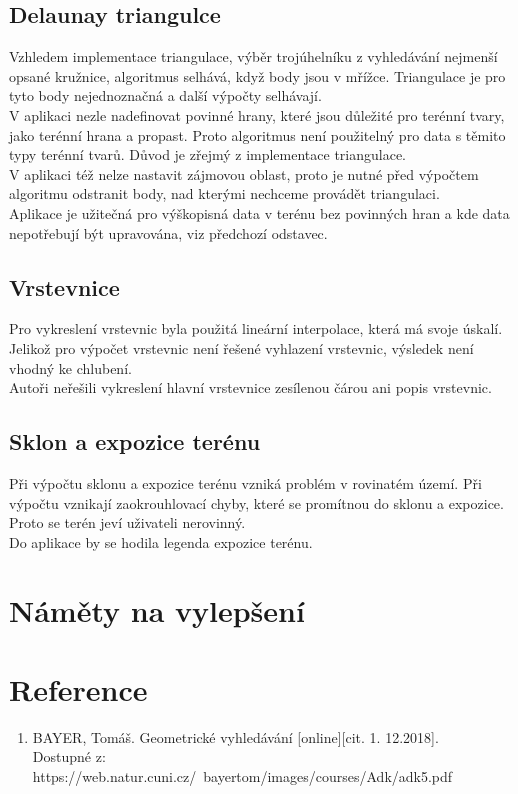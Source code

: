 \documentclass[a4paper, 12pt]{article}
\begin{document}
\subsection{Delaunay triangulce}
Vzhledem implementace triangulace, výběr trojúhelníku z vyhledávání nejmenší opsané kružnice, algoritmus selhává, když body jsou v mřížce. Triangulace je pro tyto body nejednoznačná a další výpočty selhávají.\\

V aplikaci nezle nadefinovat povinné hrany, které jsou důležité pro terénní tvary, jako terénní hrana a propast. Proto algoritmus není použitelný pro data s těmito typy terénní tvarů. Důvod je zřejmý z implementace triangulace.\\

V aplikaci též nelze nastavit zájmovou oblast, proto je nutné před výpočtem algoritmu odstranit body, nad kterými nechceme provádět triangulaci.\\

Aplikace je užitečná pro výškopisná data v terénu bez povinných hran a kde data nepotřebují být upravována, viz předchozí odstavec. \\

\subsection{Vrstevnice}
Pro vykreslení vrstevnic byla použitá lineární interpolace, která má svoje úskalí. Jelikož pro výpočet vrstevnic není řešené vyhlazení vrstevnic, výsledek není vhodný ke chlubení.\\

Autoři neřešili vykreslení hlavní vrstevnice zesílenou čárou ani popis vrstevnic. \\

\subsection{Sklon a expozice terénu}
Při výpočtu sklonu a expozice terénu vzniká problém v rovinatém území. Při výpočtu vznikají zaokrouhlovací chyby, které se promítnou do sklonu a expozice. Proto se terén jeví uživateli nerovinný.\\

Do aplikace by se hodila legenda expozice terénu.\\

\section{Náměty na vylepšení}



\clearpage
\section{Reference}

\begin{enumerate}
\item  BAYER, Tomáš. Geometrické vyhledávání [online][cit. 1. 12.2018]. \\
Dostupné z: https://web.natur.cuni.cz/~bayertom/images/courses/Adk/adk5.pdf  \\




\end{enumerate}
\end{document}
